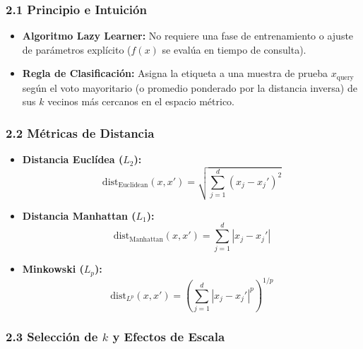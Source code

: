 \subsubsection{2.1 Principio e Intuición}

\begin{itemize}
	\item \textbf{Algoritmo Lazy Learner:} No requiere una fase de entrenamiento o ajuste de parámetros explícito ($f(x)$ se evalúa en tiempo de consulta).
	
	\item \textbf{Regla de Clasificación:} Asigna la etiqueta a una muestra de prueba $x_{\text{query}}$ según el voto mayoritario (o promedio ponderado por la distancia inversa) de sus $k$ vecinos más cercanos en el espacio métrico.
\end{itemize}

\subsubsection{2.2 Métricas de Distancia}

\begin{itemize}
	\item \textbf{Distancia Euclídea ($L_2$):}
	$$\text{dist}_{\text{Euclidean}}(x, x') = \sqrt{\sum_{j=1}^{d} (x_j - x_j')^2}$$
	
	\item \textbf{Distancia Manhattan ($L_1$):}
	$$\text{dist}_{\text{Manhattan}}(x, x') = \sum_{j=1}^{d} |x_j - x_j'|$$
	
	\item \textbf{Minkowski ($L_p$):} 
	$$\text{dist}_{L^p}(x, x') = \left( \sum_{j=1}^{d} |x_j - x_j'|^p \right)^{1/p}$$
\end{itemize}

\subsubsection{2.3 Selección de $k$ y Efectos de Escala}

